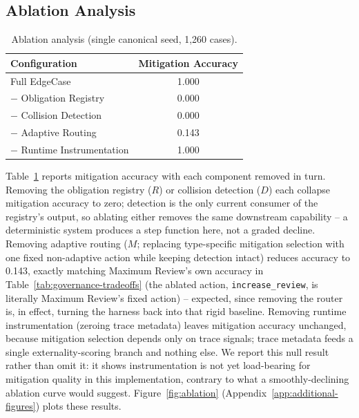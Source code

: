 \documentclass[letterpaper]{article} %
\begin{document}
\subsection{Ablation Analysis}
\begin{table}[t]
\centering
\small
\begin{tabular}{lc}
\toprule
Configuration & Mitigation Accuracy \\
\midrule
Full EdgeCase & 1.000 \\
$-$ Obligation Registry & 0.000 \\
$-$ Collision Detection & 0.000 \\
$-$ Adaptive Routing & 0.143 \\
$-$ Runtime Instrumentation & 1.000 \\
\bottomrule
\end{tabular}
\caption{Ablation analysis (single canonical seed, 1,260 cases).}
\label{tab:ablation}
\end{table}
Table~\ref{tab:ablation} reports mitigation accuracy with each component removed in turn. Removing the obligation registry ($R$) or collision detection ($D$) each collapse mitigation accuracy to zero; detection is the only current consumer of the registry's output, so ablating either removes the same downstream capability -- a deterministic system produces a step function here, not a graded decline. Removing adaptive routing ($M$; replacing type-specific mitigation selection with one fixed non-adaptive action while keeping detection intact) reduces accuracy to 0.143, exactly matching Maximum Review's own accuracy in Table~\ref{tab:governance-tradeoffs} (the ablated action, \texttt{increase\_review}, is literally Maximum Review's fixed action) -- expected, since removing the router is, in effect, turning the harness back into that rigid baseline. Removing runtime instrumentation (zeroing trace metadata) leaves mitigation accuracy unchanged, because mitigation selection depends only on trace signals; trace metadata feeds a single externality-scoring branch and nothing else. We report this null result rather than omit it: it shows instrumentation is not yet load-bearing for mitigation quality in this implementation, contrary to what a smoothly-declining ablation curve would suggest. Figure~\ref{fig:ablation} (Appendix~\ref{app:additional-figures}) plots these results.
\end{document}
